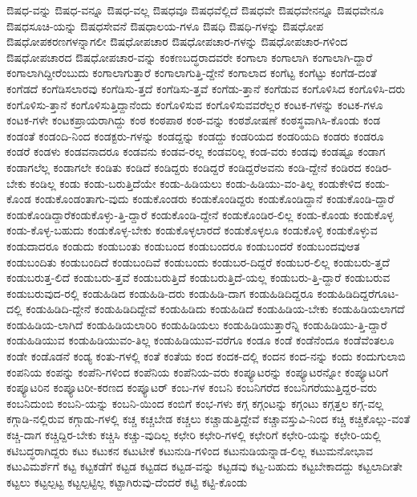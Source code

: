 {ಔಷಧ-ವನ್ನು
ಔಷಧ-ವನ್ನೂ
ಔಷಧ-ವಲ್ಲ
ಔಷಧವೂ
ಔಷಧವೆಲ್ಲಿದೆ
ಔಷಧವೇ
ಔಷಧವೇನನ್ನೂ
ಔಷಧವೇನೂ
ಔಷಧಸೂಚಿ-ಯನ್ನು
ಔಷಧಸೇವನೆ
ಔಷಧಾಲಯ-ಗಳೂ
ಔಷಧಿ
ಔಷಧಿ-ಗಳನ್ನು
ಔಷಧೋಪ
ಔಷಧೋಪಕರಣಗಳನ್ನಾಗಲೀ
ಔಷಧೋಪಚಾರ
ಔಷಧೋಪಚಾರ-ಗಳನ್ನು
ಔಷಧೋಪಚಾರ-ಗಳಿಂದ
ಔಷಧೋಪಚಾರದ
ಔಷಧೋಪಚಾರ-ವನ್ನು
ಕಂಕಣಬದ್ಧರಾದವರೇ
ಕಂಗಾಲಾ
ಕಂಗಾಲಾಗಿ
ಕಂಗಾಲಾಗಿ-ದ್ದಾರೆ
ಕಂಗಾಲಾಗಿದ್ದೀರೆಂಬುದು
ಕಂಗಾಲಾಗುತ್ತಾರೆ
ಕಂಗಾಲಾಗುತ್ತಿ-ದ್ದೇನೆ
ಕಂಗಾಲಾದ
ಕಂಗೆಟ್ಟ
ಕಂಗೆಟ್ಟು
ಕಂಗೆಡ-ದಂತೆ
ಕಂಗೆಡದೆ
ಕಂಗೆಡಿಸಲಾರವು
ಕಂಗೆಡಿಸು-ತ್ತದೆ
ಕಂಗೆಡಿಸು-ತ್ತವೆ
ಕಂಗೆಡು-ತ್ತಾನೆ
ಕಂಗೆಡುವ
ಕಂಗೊಳಿಸಿದ
ಕಂಗೊಳಿಸಿ-ದರು
ಕಂಗೊಳಿಸು-ತ್ತಾನೆ
ಕಂಗೊಳಿಸುತ್ತಿದ್ದಾನೆಂದು
ಕಂಗೊಳಿಸುವ
ಕಂಗೊಳಿಸುವವರೆಲ್ಲರ
ಕಂಟಕ-ಗಳನ್ನು
ಕಂಟಕ-ಗಳೂ
ಕಂಟಕ-ಗಳೇ
ಕಂಟಕಪ್ರಾಯರಾಗಿದ್ದು
ಕಂಠ
ಕಂಠಪಾಠ
ಕಂಠ-ವನ್ನು
ಕಂಠಶೋಷಣೆ
ಕಂಠಸ್ಥವಾಗಿಸಿ-ಕೊಂಡು
ಕಂಡ
ಕಂಡಂತೆ
ಕಂಡಂದಿ-ನಿಂದ
ಕಂಡಕ್ಟರು-ಗಳನ್ನು
ಕಂಡದ್ದನ್ನು
ಕಂಡದ್ದು
ಕಂಡರಿಯದ
ಕಂಡರಿಯದಿ
ಕಂಡರು
ಕಂಡರೂ
ಕಂಡರೆ
ಕಂಡಳು
ಕಂಡವನಾದರೂ
ಕಂಡವನು
ಕಂಡವ-ರಲ್ಲ
ಕಂಡವರಿಲ್ಲ
ಕಂಡ-ವರು
ಕಂಡವು
ಕಂಡಷ್ಟೂ
ಕಂಡಾಗ
ಕಂಡಾಗಲೆಲ್ಲ
ಕಂಡಾಗಲೇ
ಕಂಡಿತು
ಕಂಡಿದೆ
ಕಂಡಿದ್ದರು
ಕಂಡಿದ್ದರೆ
ಕಂಡಿದ್ದರೆಅವನು
ಕಂಡಿ-ದ್ದೇನೆ
ಕಂಡಿರದ
ಕಂಡಿರ-ಬೇಕು
ಕಂಡಿಲ್ಲ
ಕಂಡು
ಕಂಡು-ಬರುತ್ತಿದೆಯೇ
ಕಂಡು-ಹಿಡಿಯಲು
ಕಂಡು-ಹಿಡಿಯು-ವಂ-ತಿಲ್ಲ
ಕಂಡುಕೇಳಿದ
ಕಂಡು-ಕೊಂಡ
ಕಂಡುಕೊಂಡಂತಾಗು-ವುದು
ಕಂಡುಕೊಂಡರು
ಕಂಡುಕೊಂಡಿದ್ದರು
ಕಂಡುಕೊಂಡಿದ್ದಾನೆ
ಕಂಡುಕೊಂಡಿ-ದ್ದಾರೆ
ಕಂಡುಕೊಂಡಿದ್ದಾರೆಕಂಡುಕೊಳ್ಳು-ತ್ತಿ-ದ್ದಾರೆ
ಕಂಡುಕೊಂಡಿ-ದ್ದೇನೆ
ಕಂಡುಕೊಂಡಿರ-ಲಿಲ್ಲ
ಕಂಡು-ಕೊಂಡು
ಕಂಡುಕೊಳ್ಳ
ಕಂಡು-ಕೊಳ್ಳ-ಬಹುದು
ಕಂಡುಕೊಳ್ಳ-ಬೇಕು
ಕಂಡುಕೊಳ್ಳಲಾರದೆ
ಕಂಡುಕೊಳ್ಳಲೂ
ಕಂಡುಕೊಳ್ಳಿ
ಕಂಡುಕೊಳ್ಳುವ
ಕಂಡುದಾದರೂ
ಕಂಡುದು
ಕಂಡುಬಂತು
ಕಂಡುಬಂದ
ಕಂಡುಬಂದರೂ
ಕಂಡುಬಂದರೆ
ಕಂಡುಬಂದವುಆತ
ಕಂಡುಬಂದಿತು
ಕಂಡುಬಂದಿದೆ
ಕಂಡುಬಂದಿವೆ
ಕಂಡುಬಂದು
ಕಂಡುಬರ-ದಿದ್ದರೆ
ಕಂಡುಬರ-ಲಿಲ್ಲ
ಕಂಡುಬರು-ತ್ತದೆ
ಕಂಡುಬರುತ್ತ-ಲಿದೆ
ಕಂಡುಬರು-ತ್ತವೆ
ಕಂಡುಬರುತ್ತಿದೆ
ಕಂಡುಬರುತ್ತಿದೆ-ಯಲ್ಲ
ಕಂಡುಬರು-ತ್ತಿ-ದ್ದಾರೆ
ಕಂಡುಬರುವ
ಕಂಡುಬರುವುದ-ರಲ್ಲಿ
ಕಂಡುಹಿಡಿದ
ಕಂಡುಹಿಡಿ-ದರು
ಕಂಡುಹಿಡಿ-ದಾಗ
ಕಂಡುಹಿಡಿದಿದ್ದರೂ
ಕಂಡುಹಿಡಿದಿದ್ದರೆಗೂಟ-ದಲ್ಲಿ
ಕಂಡುಹಿಡಿದಿ-ದ್ದೇನೆ
ಕಂಡುಹಿಡಿದಿದ್ದೇವೆ
ಕಂಡುಹಿಡಿದು
ಕಂಡುಹಿಡಿದೆ
ಕಂಡುಹಿಡಿಯ-ಬೇಕು
ಕಂಡುಹಿಡಿಯಲಾಗದೆ
ಕಂಡುಹಿಡಿಯ-ಲಾಗಿದೆ
ಕಂಡುಹಿಡಿಯಲಾರಿರಿ
ಕಂಡುಹಿಡಿಯಲು
ಕಂಡುಹಿಡಿಯುತ್ತಾರೆನ್ನಿ
ಕಂಡುಹಿಡಿಯು-ತ್ತಿ-ದ್ದಾರೆ
ಕಂಡುಹಿಡಿಯುವ
ಕಂಡುಹಿಡಿಯುವಂ-ತಿಲ್ಲ
ಕಂಡುಹಿಡಿಯುವ-ವರೆಗೂ
ಕಂಡೂ
ಕಂಡೆ
ಕಂಡೆನೆಂದೂ
ಕಂಡೆವೆಂತಲೂ
ಕಂಡೇ
ಕಂಡೊಡನೆ
ಕಂಡ್ಯ
ಕಂತು-ಗಳಲ್ಲಿ
ಕಂತೆ
ಕಂತೆಯ
ಕಂದ
ಕಂದಕ-ದಲ್ಲಿ
ಕಂದನ
ಕಂದ-ನನ್ನು
ಕಂದು
ಕಂದುಗುಲಾಬಿ
ಕಂಪನಿಯ
ಕಂಪನ್ನು
ಕಂಪೆನಿ-ಗಳಿಂದ
ಕಂಪೆನಿಯ
ಕಂಪೆನಿಯ-ವರು
ಕಂಪ್ಯೂಟರನ್ನು
ಕಂಪ್ಯೂಟರನ್ನೋ
ಕಂಪ್ಯೂಟರಿಗೆ
ಕಂಪ್ಯೂಟರಿನ
ಕಂಪ್ಯೂಟರೀ-ಕರಣದ
ಕಂಪ್ಯೂಟರ್
ಕಂಬ-ಗಳ
ಕಂಬನಿ
ಕಂಬನಿಗರೆದ
ಕಂಬನಿಗರೆಯುತ್ತಿದ್ದರ-ವರು
ಕಂಬನಿದುಂಬಿ
ಕಂಬನಿ-ಯನ್ನು
ಕಂಬನಿ-ಯಿಂದ
ಕಂಬಿಗೆ
ಕಂಭ-ಗಳು
ಕಗ್ಗ
ಕಗ್ಗಂಟನ್ನು
ಕಗ್ಗಂಟು
ಕಗ್ಗತ್ತಲ
ಕಗ್ಗ-ವಲ್ಲ
ಕಗ್ಗಾಡಿ-ನಲ್ಲಿರುವ
ಕಗ್ಗಾಡು-ಗಳಲ್ಲಿ
ಕಚ್ಚ
ಕಚ್ಚಬೇಡ
ಕಚ್ಚಲು
ಕಚ್ಚಾಡುತ್ತಿದ್ದೇವೆ
ಕಚ್ಚಾವಸ್ತುವಿ-ನಿಂದ
ಕಚ್ಚಿ
ಕಚ್ಚಿಕೊಲ್ಲು-ವಂತೆ
ಕಚ್ಚಿ-ದಾಗ
ಕಚ್ಚಿದ್ದಿರ-ಬೇಕು
ಕಚ್ಚಿಸಿ
ಕಚ್ಚು-ವುದಿಲ್ಲ
ಕಛೇರಿ
ಕಛೇರಿ-ಗಳಲ್ಲಿ
ಕಛೇರಿಗೆ
ಕಛೇರಿ-ಯನ್ನು
ಕಛೇರಿ-ಯಲ್ಲಿ
ಕಟಿಬದ್ಧರಾಗಿದ್ದರು
ಕಟು
ಕಟುಕನ
ಕಟುಟೀಕೆ
ಕಟುನುಡಿ-ಗಳಿಂದ
ಕಟುನುಡಿಯನ್ನಾಡ-ಲಿಲ್ಲ
ಕಟುಮನೋಭಾವ
ಕಟುವಿಮರ್ಶೆಗೆ
ಕಟ್ಟ
ಕಟ್ಟಕಡೆಗೆ
ಕಟ್ಟಡ
ಕಟ್ಟಡದ
ಕಟ್ಟಡ-ವನ್ನು
ಕಟ್ಟಡವು
ಕಟ್ಟ-ಬಹುದು
ಕಟ್ಟಬೇಕಾದದ್ದು
ಕಟ್ಟಲಾದೀತೇ
ಕಟ್ಟಲು
ಕಟ್ಟಲ್ಪಟ್ಟ
ಕಟ್ಟಲ್ಪಟ್ಟಿಲ್ಲ
ಕಟ್ಟಾಗಿರುವು-ದೆಂದರೆ
ಕಟ್ಟಿ
ಕಟ್ಟಿ-ಕೊಂಡು
}
